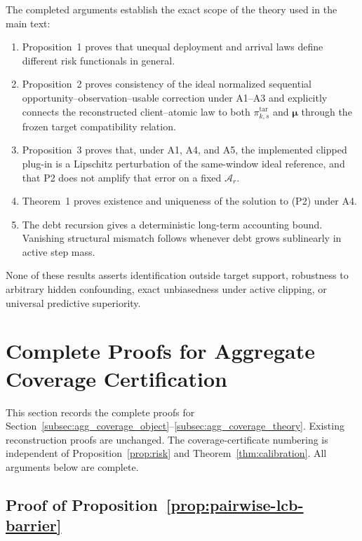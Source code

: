 The completed arguments establish the exact scope of the theory used in
the main text:

\begin{enumerate}
    \item Proposition~1 proves that unequal deployment and arrival laws define
    different risk functionals in general.
    \item Proposition~2 proves consistency of the ideal normalized sequential
    opportunity--observation--usable correction under A1--A3 and explicitly
    connects the reconstructed client--atomic law to both
    $\pi^{\mathrm{tar}}_{k,s}$ and $\boldsymbol\mu$ through the frozen target
    compatibility relation.
    \item Proposition~3 proves that, under A1, A4, and A5, the implemented
    clipped plug-in is a Lipschitz perturbation of the same-window ideal
    reference, and that P2 does not amplify that error on a fixed
    $\mathcal{A}_r$.
    \item Theorem~1 proves existence and uniqueness of the solution to (P2)
    under A4.
    \item The debt recursion gives a deterministic long-term accounting bound.
    Vanishing structural mismatch follows whenever debt grows sublinearly in
    active step mass.
\end{enumerate}

None of these results asserts identification outside target support, robustness
to arbitrary hidden confounding, exact unbiasedness under active clipping, or
universal predictive superiority.


\section{Complete Proofs for Aggregate Coverage Certification}
\label{app:agg_coverage_proofs}

This section records the complete proofs for
Section~\ref{subsec:agg_coverage_object}--\ref{subsec:agg_coverage_theory}.
Existing reconstruction proofs are unchanged.  The coverage-certificate
numbering is independent of Proposition~\ref{prop:risk} and
Theorem~\ref{thm:calibration}.  All arguments below are complete.

\subsection{Proof of Proposition~\ref{prop:pairwise-lcb-barrier}}
\label{app:proof_pairwise_lcb}

